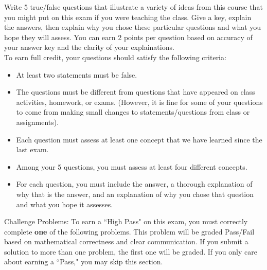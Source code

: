 \documentclass[11pt,addpoints,letterpaper]{exam}
\begin{document}
\begin{questions}

 \vfill

\newpage

\question[10] Write 5 true/false questions that illustrate a variety of ideas from this course that you might put on this exam if you were teaching the class. Give a key, explain the answers, then explain why you chose these particular questions and what you hope they will assess. You can earn 2 points per question based on accuracy of your answer key and the clarity of your explainations.\\
To earn full credit, your questions should satisfy the following criteria:
\begin{itemize}
\item At least two statements must be false.
\item The questions must be different from questions that have appeared on class activities, homework, or exams. (However, it is fine for some of your questions to come from making small changes to statements/questions from class or assignments).
\item Each question must assess at least one concept that we have learned since the last exam. 
\item Among your 5 questions, you must assess at least four different concepts. 
\item For each question, you must include the answer, a thorough explanation of why that is the answer, and an explanation of why you chose that question and what you hope it assesses. 
\end{itemize}

\vfill

\newpage 

{Challenge Problems:} To earn a ``High Pass" on this exam, you must correctly complete {\bf one} of the following problems. This problem will be graded Pass/Fail based on mathematical correctness and clear communication. If you submit a solution to more than one problem, the first one will be graded.  If you only care about earning a ``Pass," you may skip this section.

\end{questions}
\end{document}
